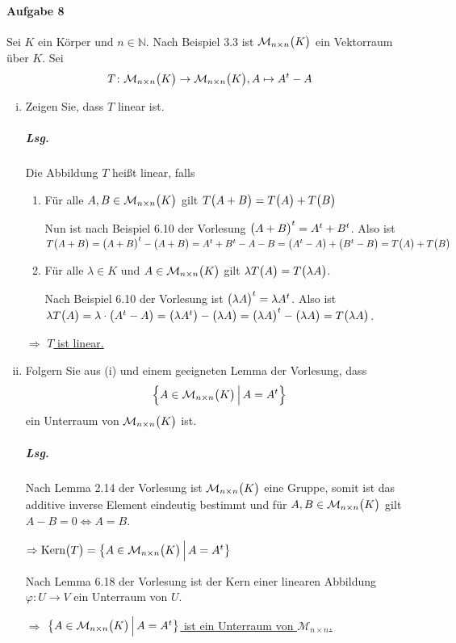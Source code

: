 \documentclass{scrreprt}
\newcommand\Kern{\text{Kern}}
\begin{document}
\paragraph{Aufgabe 8} Sei $K$ ein Körper und $n \in \mathbb{N}$.
Nach Beispiel 3.3 ist $\mathcal{M}_{n \times n}\qty\big(K)$ ein
Vektorraum über $K$.
Sei
\[
  T \colon \mathcal{M}_{n \times n} \qty\big(K) \to
  \mathcal{M}_{n \times n} \qty\big(K), A \mapsto A^t - A
\]
\begin{enumerate}[(i)]
\item Zeigen Sie, dass $T$ linear ist.
  \subparagraph{Lsg.} Die Abbildung $T$ heißt linear, falls
  \begin{enumerate}[(1)]
  \item Für alle $A, B \in \mathcal{M}_{n \times n} \qty\big(K)$ gilt
    $T\qty\big(A + B) = T\qty\big(A) + T\qty\big(B)$

    Nun ist nach Beispiel 6.10 der Vorlesung $\qty\big(A + B)^t = A^t + B^t$.
    Also ist $T\qty\big(A + B) = \qty\big(A + B)^t - \qty\big(A + B)
    = A^t + B^t - A - B = \qty\big(A^t - A) + \qty\big(B^t - B)
    = T\qty\big(A) + T\qty\big(B)$

  \item Für alle $\lambda \in K$ und $A \in \mathcal{M}_{n \times n} \qty\big(K)$
    gilt $\lambda T\qty\big(A) = T\qty\big(\lambda A)$.

    Nach Beispiel 6.10 der Vorlesung ist $\qty\big(\lambda A)^t = \lambda A^t$.
    Also ist \\
    $\lambda T\qty\big(A) = \lambda \cdot \qty\big(A^t - A)
    = \qty\big(\lambda A^t) - \qty\big(\lambda A)
    = \qty\big(\lambda A)^t - \qty\big(\lambda A) = T\qty\big(\lambda A)$.
  \end{enumerate}

  $\Rightarrow$ \underline{$T$ ist linear.}

\item Folgern Sie aus (i) und einem geeigneten Lemma der Vorlesung, dass
  \[
    \qty\Big{
      A \in \mathcal{M}_{n \times n} \qty\big(K)
      \,{\Big |}\, A = A^t
    }
  \]
  ein Unterraum von $\mathcal{M}_{n \times n} \qty\big(K)$ ist.

  \subparagraph{Lsg.} Nach Lemma 2.14 der Vorlesung ist
  $\mathcal{M}_{n \times n} \qty\big(K)$ eine Gruppe, somit ist das additive
  inverse Element eindeutig bestimmt und für
  $A, B \in \mathcal{M}_{n \times n} \qty\big(K)$ gilt $A - B = 0 \iff A = B$.

  $\Rightarrow \Kern\qty\big(T) = \qty\big{
      A \in \mathcal{M}_{n \times n} \qty\big(K)
      \,{\Big |}\, A = A^t
    }$

  Nach Lemma 6.18 der Vorlesung ist der Kern einer linearen
  Abbildung $\varphi \colon U \to V$ ein Unterraum von $U$.

  $\Rightarrow$ \underline{$\qty\big{
      A \in \mathcal{M}_{n \times n} \qty\big(K)
      \,{\Big |}\, A = A^t
    }$ ist ein Unterraum von $\mathcal{M}_{n \times n}$.}
\end{enumerate}
\end{document}
